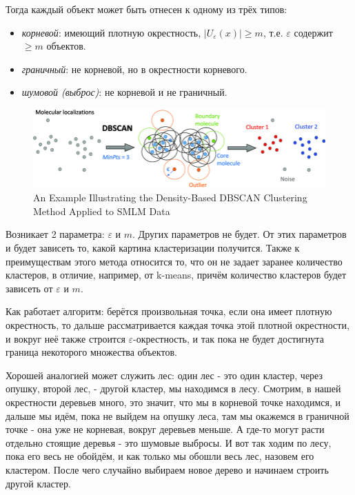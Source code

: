 Тогда каждый объект может быть отнесен к одному из трёх типов:
\begin{itemize}
    \item \textit{корневой}: имеющий плотную окрестность,  {$\lvert U_\varepsilon (x) \rvert \geq m$}, т.е. $\varepsilon$ содержит $\geq m$ объектов.
    \item \textit{граничный}: не корневой, но в окрестности корневого.
    \item \textit{шумовой (выброс)}: не корневой и не граничный.
\end{itemize}
\begin{figure}[h!]
    \centering
    \includegraphics[width=0.9\linewidth]{chapters/clustering/images/An-Example-Illustrating-the-Density-Based-DBSCAN-Clustering-Method-Applied-to-SMLM-Data.png}
    \caption{An Example Illustrating the Density-Based DBSCAN Clustering Method Applied to SMLM Data}
    \label{fig:enter-label-2}
\end{figure}
Возникает 2 параметра: $\varepsilon$ и $m$. Других параметров не будет. От этих параметров и будет зависеть то, какой картина кластеризации получится. Также к преимуществам этого метода относится то, что он не задает заранее количество кластеров, в отличие, например, от k-means, причём количество кластеров будет зависеть от $\varepsilon$ и $m$. 

Как работает алгоритм: берётся произвольная точка, если она имеет плотную окрестность, то дальше рассматривается каждая точка этой плотной окрестности, и вокруг неё также строится $\varepsilon$-окрестность, и так пока не будет достигнута граница некоторого множества объектов. 

Хорошей аналогией может служить лес: один лес - это один кластер, через опушку, второй лес, - другой кластер, мы находимся в лесу. Смотрим, в нашей окрестности деревьев много, это значит, что мы в корневой точке находимся, и дальше мы идём, пока не выйдем на опушку леса, там мы окажемся в граничной точке - она уже не корневая, вокруг деревьев меньше. А где-то могут расти отдельно стоящие деревья - это шумовые выбросы. И вот так ходим по лесу, пока его весь не обойдём, и как только мы обошли весь лес, назовем его кластером. После чего случайно выбираем новое дерево и начинаем строить другой кластер.

